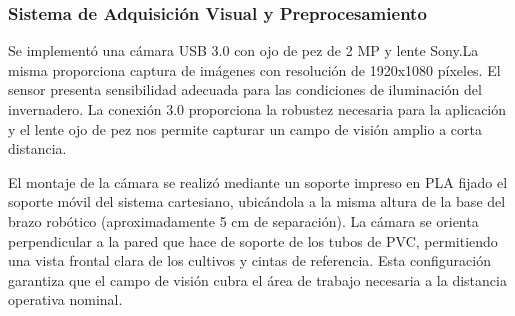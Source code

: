 \subsubsection{Sistema de Adquisición Visual y Preprocesamiento}

Se implementó una cámara USB 3.0 con ojo de pez de 2 MP y lente Sony.La misma proporciona captura de imágenes con resolución de 1920x1080 píxeles. El sensor presenta sensibilidad adecuada para las condiciones de iluminación del invernadero. La conexión 3.0 proporciona la robustez necesaria para la aplicación y el lente ojo de pez nos permite capturar un campo de visión amplio a corta distancia.

El montaje de la cámara se realizó mediante un soporte impreso en PLA fijado el soporte móvil del sistema cartesiano, ubicándola a la misma altura de la base del brazo robótico (aproximadamente 5 cm de separación). La cámara se orienta perpendicular a la pared que hace de soporte de los tubos de PVC, permitiendo una vista frontal clara de los cultivos y cintas de referencia. Esta configuración garantiza que el campo de visión cubra el área de trabajo necesaria a la distancia operativa nominal.
